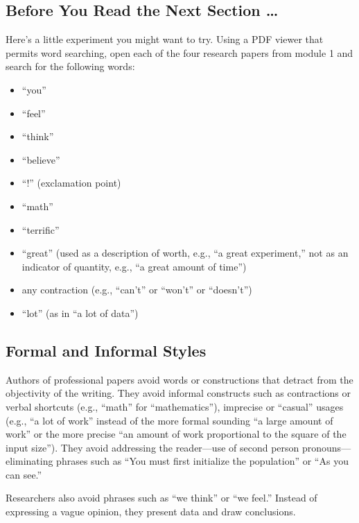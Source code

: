 
\usepackage[compact]{titlesec}




\subsection*{Before You Read the Next Section \ldots}
Here's a little experiment you might want to try.
Using a PDF viewer that permits word searching, open each of the four
research papers from module 1 and search for the following words:
\begin{itemize}
\item
``you''
\item
``feel''
\item
``think''
\item
``believe''
\item
``!'' (exclamation point)
\item
``math''
\item
``terrific''
\item
``great'' (used as a description of worth, e.g., ``a great experiment,'' not
as an indicator of quantity, e.g., ``a great amount of time'')
\item
any contraction (e.g., ``can't'' or ``won't'' or ``doesn't'')
\item
``lot'' (as in ``a lot of data'')
\end{itemize}

\subsection*{Formal and Informal Styles}
Authors of professional papers avoid words or constructions
that detract from the objectivity of the writing. They avoid informal
constructs such as contractions or verbal shortcuts (e.g., ``math''
for ``mathematics''), imprecise or ``casual'' usages (e.g., ``a lot
of work'' instead of the more formal sounding ``a large amount
of work'' or the more precise ``an amount of work proportional to 
the square of the input size''). They avoid addressing the reader---use
of second person pronouns---eliminating phrases such as
``You must first initialize the population''
or 
``As you can see.''

Researchers also avoid phrases such as ``we think'' or ``we feel.'' Instead
of expressing a vague opinion, they present data and draw conclusions.

